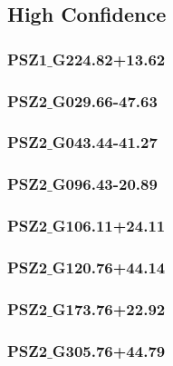 \documentclass[apj, revtex4]{emulateapj}
\begin{document}
\subsection{High Confidence}


\subsubsection{PSZ1$\_$G224.82+13.62}

\subsubsection{PSZ2$\_$G029.66-47.63}

\subsubsection{PSZ2$\_$G043.44-41.27}

\subsubsection{PSZ2$\_$G096.43-20.89}

\subsubsection{PSZ2$\_$G106.11+24.11}

\subsubsection{PSZ2$\_$G120.76+44.14}

\subsubsection{PSZ2$\_$G173.76+22.92}

\subsubsection{PSZ2$\_$G305.76+44.79}
\end{document}

